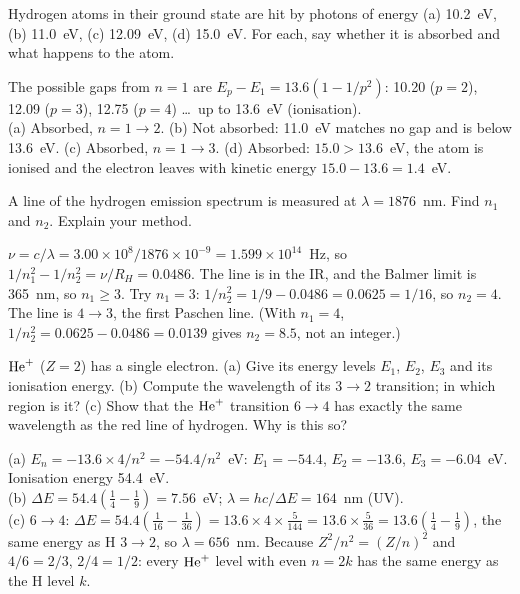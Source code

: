 Hydrogen atoms in their ground state are hit by photons of energy (a) 10.2~eV, (b) 11.0~eV,
(c) 12.09~eV, (d) 15.0~eV. For each, say whether it is absorbed and what happens to the atom.
\begin{solution}
The possible gaps from $n = 1$ are $E_p - E_1 = 13.6(1 - 1/p^2)$: 10.20 ($p = 2$), 12.09 ($p = 3$),
12.75 ($p = 4$) \dots\ up to 13.6~eV (ionisation).\\
(a) Absorbed, $n = 1\to2$. (b) Not absorbed: 11.0~eV matches no gap and is below 13.6~eV.
(c) Absorbed, $n = 1\to3$. (d) Absorbed: $15.0 > 13.6$~eV, the atom is ionised and the electron leaves
with kinetic energy $15.0 - 13.6 = 1.4$~eV.
\end{solution}

A line of the hydrogen emission spectrum is measured at $\lambda = 1876$~nm. Find $n_1$ and $n_2$.
Explain your method.
\begin{solution}
$\nu = c/\lambda = 3.00\times10^8/1876\times10^{-9} = 1.599\times10^{14}$~Hz, so
$1/n_1^2 - 1/n_2^2 = \nu/R_H = 0.0486$. The line is in the IR, and the Balmer limit is 365~nm, so
$n_1\ge3$. Try $n_1 = 3$: $1/n_2^2 = 1/9 - 0.0486 = 0.0625 = 1/16$, so $n_2 = 4$.
The line is $4\to3$, the first Paschen line. (With $n_1 = 4$, $1/n_2^2 = 0.0625 - 0.0486 = 0.0139$ gives
$n_2 = 8.5$, not an integer.)
\end{solution}

$\ce{He+}$ ($Z = 2$) has a single electron. (a) Give its energy levels $E_1$, $E_2$, $E_3$ and its
ionisation energy. (b) Compute the wavelength of its $3\to2$ transition; in which region is it?
(c) Show that the $\ce{He+}$ transition $6\to4$ has exactly the same wavelength as the red line of
hydrogen. Why is this so?
\begin{solution}
(a) $E_n = -13.6\times4/n^2 = -54.4/n^2$~eV: $E_1 = -54.4$, $E_2 = -13.6$, $E_3 = -6.04$~eV.
Ionisation energy 54.4~eV.\\
(b) $\Delta E = 54.4(\frac14-\frac19) = 7.56$~eV; $\lambda = hc/\Delta E = 164$~nm (UV).\\
(c) $6\to4$: $\Delta E = 54.4(\frac1{16}-\frac1{36}) = 13.6\times4\times\frac{5}{144} =
13.6\times\frac5{36} = 13.6(\frac14-\frac19)$, the same energy as H $3\to2$, so $\lambda = 656$~nm.
Because $Z^2/n^2 = (Z/n)^2$ and $4/6 = 2/3$, $2/4 = 1/2$: every $\ce{He+}$ level with even $n = 2k$ has the
same energy as the H level $k$.
\end{solution}

